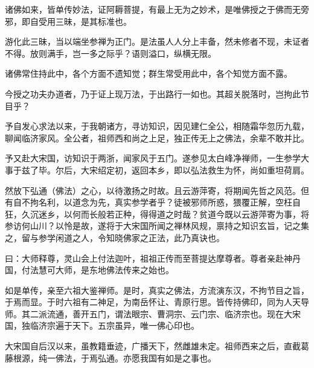 




诸佛如来，皆单传妙法，证阿耨菩提，有最上无为之妙术，是唯佛授之于佛而无旁邪，即自受用三昧，是其标准也。

游化此三昧，当以端坐参禅为正门。是法虽人人分上丰备，然未修者不现，未证者不得。放则满手，岂一多之际乎？语则溢口，纵横无限。

诸佛常住持此中，各个方面不遗知觉；群生常受用此中，各个知觉方面不露。

今授之功夫办道者，乃于证上现万法，于出路行一如也。其超关脱落时，岂拘此节目乎？

予自发心求法以来，于我朝诸方，寻访知识，因见建仁全公，相随霜华忽历九载，聊闻临济家风。全公者，祖师西和尚之上足，独正传无上之佛法，余辈不敢并比。

予又赴大宋国，访知识于两浙，闻家风于五门。遂参见太白峰净禅师，一生参学大事于兹了毕。尔后，大宋绍定初，返回本乡，即以弘法救生为怀，尚如重坦荷肩。

然放下弘通（佛法）之心，以待激扬之时故。且云游萍寄，将期闻先哲之风范。但有自不拘名利，以道念为先，真实参学者乎？徒被邪师所惑，猥覆正解，空枉自狂，久沉迷乡，以何而长般若正种，得得道之时哉？贫道今既以云游萍寄为事，将参访何山川？以怜是故，遂将于大宋国所闻之禅林风规，禀持之知识玄旨，记之集之，留与参学闲道之人，令知晓佛家之正法，此乃真诀也。

曰：大师释尊，灵山会上付法迦叶，祖祖正传而至菩提达摩尊者。尊者亲赴神丹国，付法慧可大师，是东地佛法传来之始也。

如是单传，亲至六祖大鉴禅师。是时，真实之佛法，方流演东汉，不拘节目之旨，于焉而显。于时六祖有二神足，为南岳怀让、青原行思。皆传持佛印，同为人天导师。其二派流通，善开五门，谓法眼宗、曹洞宗、云门宗、临济宗也。现在大宋国，独临济宗遍于天下。五宗虽异，唯一佛心印也。

大宋国自后汉以来，虽教籍垂迹，广播天下，然雌雄未定。祖师西来之后，直截葛藤根源，纯一佛法，于焉弘通。亦愿我国有如是之事也。